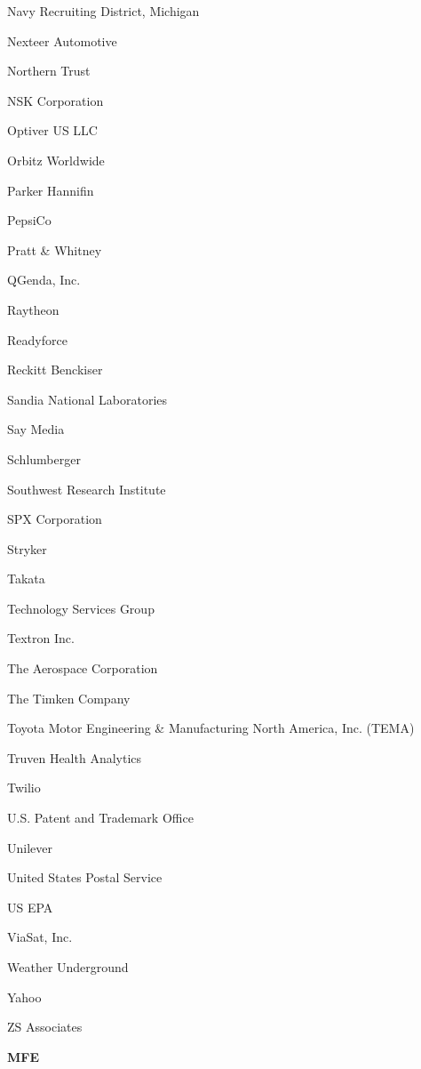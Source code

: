\documentclass[twoside]{article}
\begin{document}
\begin{center}
\begin{multicols}{5}
\begin{FlushLeft}
\begin{compactitem}
\item Navy Recruiting District, Michigan
\item Nexteer Automotive
\item Northern Trust
\item NSK Corporation
\item Optiver US LLC
\item Orbitz Worldwide
\item Parker Hannifin
\item PepsiCo
\item Pratt \& Whitney
\item QGenda, Inc.
\item Raytheon
\item Readyforce
\item Reckitt Benckiser
\item Sandia National Laboratories
\item Say Media
\item Schlumberger
\item Southwest Research Institute
\item SPX Corporation
\item Stryker
\item Takata
\item Technology Services Group
\item Textron Inc.
\item The Aerospace Corporation
\item The Timken Company
\item Toyota Motor Engineering \& Manufacturing North America, Inc. (TEMA)
\item Truven Health Analytics
\item Twilio
\item U.S. Patent and Trademark Office
\item Unilever
\item United States Postal Service
\item US EPA
\item ViaSat, Inc.
\item Weather Underground
\item Yahoo
\item ZS Associates
\end{compactitem}
        \end{FlushLeft}
        \vspace{1em}
        {\fontsize{14}{16}\selectfont \bf MFE}\\
        \vspace{-1em}
        ~\hrulefill~

\end{multicols}
\end{center}
\end{document}
